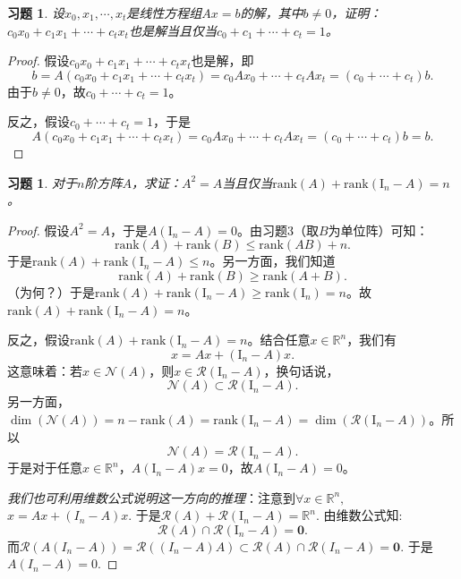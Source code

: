 \documentclass[UTF8]{ctexart}
\newtheorem{ex}[thm]{习题}
\begin{document}
\begin{ex}
	设$x_0, x_1, \cdots, x_t$是线性方程组$Ax =b$的解，其中$b \neq 0$，证明：$c_0 x_0 + c_1x_1 + \cdots + c_t x_t$也是解当且仅当$c_0 + c_1 + \cdots + c_t = 1$。
\end{ex}
\begin{proof}
	假设$c_0 x_0 + c_1x_1 + \cdots + c_t x_t$也是解，即
	\begin{equation}
		b = A(c_0 x_0 + c_1x_1 + \cdots + c_t x_t) = c_0 Ax_0+ \cdots + c_t Ax_t = (c_0+ \cdots + c_t)b.
	\end{equation}
	由于$b \neq 0$，故$c_0+ \cdots + c_t = 1$。
	\
	
	反之，假设$c_0+ \cdots + c_t = 1$，于是
	\begin{equation}
		A(c_0 x_0 + c_1x_1 + \cdots + c_t x_t) = c_0 Ax_0+ \cdots + c_t Ax_t = (c_0+ \cdots + c_t)b = b.
	\end{equation}
\end{proof}
\begin{ex}
	对于$n$阶方阵$A$，求证：$A^2 = A$当且仅当$\mathrm{rank}(A) + \mathrm{rank}(\mathrm{I}_n - A) = n $。
\end{ex}
\begin{proof}
	假设$A^2 = A$，于是$A(\mathrm{I}_n - A) =0$。由习题3（取$B$为单位阵）可知：
	\[
	\mathrm{rank}(A) + \mathrm{rank}(B) \leq \mathrm{rank}(AB) + n.  
	\]
	于是$\mathrm{rank}(A) + \mathrm{rank}(\mathrm{I}_n - A) \leq n$。另一方面，我们知道
	\begin{equation} \label{3}
		\mathrm{rank}(A) + \mathrm{rank}(B) \geq \mathrm{rank}(A+B).
	\end{equation}
	（为何？）于是$\mathrm{rank}(A) + \mathrm{rank}(\mathrm{I}_n - A)  \geq \mathrm{rank}(\mathrm{I}_n ) = n$。故$\mathrm{rank}(A) + \mathrm{rank}(\mathrm{I}_n - A) = n $。
	\
	
	反之，假设$\mathrm{rank}(A) + \mathrm{rank}(\mathrm{I}_n - A) = n $。结合任意$x \in \mathbb{R}^n$，我们有
	\[
	x = Ax + (\mathrm{I}_n - A)x.
	\]
	这意味着：若$x \in \mathcal{N}(A)$，则$x \in \mathcal{R}(\mathrm{I}_n - A)$，换句话说，
	\[
	\mathcal{N}(A) \subset \mathcal{R}(\mathrm{I}_n - A).
	\]
	另一方面，$\dim(\mathcal{N}(A)) = n - \mathrm{rank}(A) = \mathrm{rank}(\mathrm{I}_n - A)  = \dim(\mathcal{R}(\mathrm{I}_n - A))$。所以
	\[
	\mathcal{N}(A) = \mathcal{R}(\mathrm{I}_n - A).
	\]
	于是对于任意$x \in \mathbb{R}^n$，$A(\mathrm{I}_n - A) x =0$，故$A(\mathrm{I}_n - A) =0$。

{\em 我们也可利用维数公式说明这一方向的推理}：注意到$\forall x\in \mathbb{R}^n,$ $x = A x + (I_n - A) x.$ 于是$\mathcal{R}(A) + \mathcal{R}(\mathrm{I}_n - A) = \mathbb{R}^n$. 由维数公式知:
	\[
	\mathcal{R}(A) \cap \mathcal{R}(\mathrm{I}_n - A)  = \mathbf{0}.
	\]
而$\mathcal{R }(A (I_n - A)) = \mathcal{R}((I_n - A) A ) \subset \mathcal{R}(A) \cap \mathcal{R}(I_n- A) = \mathbf{0}.$ 于是$A(I_n - A) = 0.$
\end{proof}
\end{document}
